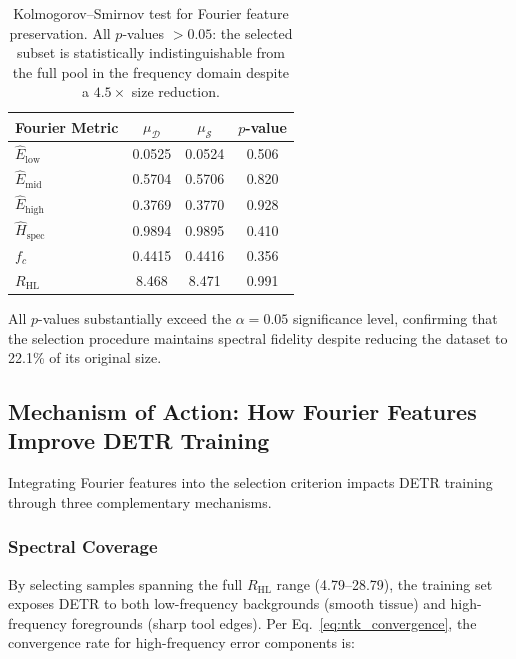 \begin{table}[h]
\centering
\caption{Kolmogorov--Smirnov test for Fourier feature preservation.
         All $p$-values $> 0.05$: the selected subset is statistically
         indistinguishable from the full pool in the frequency domain
         despite a $4.5\times$ size reduction.}
\label{tab:ks_fourier}
\begin{tabular}{lccc}
\toprule
\textbf{Fourier Metric} &
    $\mu_{\mathcal{D}}$ & $\mu_{\mathcal{S}}$ & $p$-value \\
\midrule
$\hat{E}_{\text{low}}$      & 0.0525 & 0.0524 & 0.506 \\
$\hat{E}_{\text{mid}}$      & 0.5704 & 0.5706 & 0.820 \\
$\hat{E}_{\text{high}}$     & 0.3769 & 0.3770 & 0.928 \\
$\hat{H}_{\text{spec}}$     & 0.9894 & 0.9895 & 0.410 \\
$f_c$                       & 0.4415 & 0.4416 & 0.356 \\
$R_{\text{HL}}$             & 8.468  & 8.471  & 0.991 \\
\bottomrule
\end{tabular}
\end{table}

All $p$-values substantially exceed the $\alpha = 0.05$ significance level,
confirming that the selection procedure maintains spectral fidelity despite
reducing the dataset to 22.1\% of its original size.


\subsection{Mechanism of Action: How Fourier Features Improve DETR Training}
\label{sec:mechanism}

Integrating Fourier features into the selection criterion impacts DETR
training through three complementary mechanisms.

\subsubsection{Spectral Coverage}

By selecting samples spanning the full $R_{\text{HL}}$ range (4.79--28.79),
the training set exposes DETR to both low-frequency backgrounds (smooth
tissue) and high-frequency foregrounds (sharp tool edges).  Per
Eq.~\ref{eq:ntk_convergence}, the convergence rate for high-frequency error
components is:


